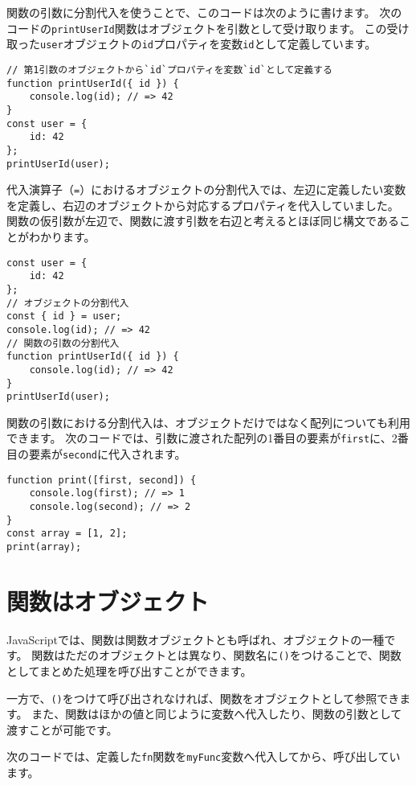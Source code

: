 関数の引数に分割代入を使うことで、このコードは次のように書けます。
次のコードの\texttt{printUserId}関数はオブジェクトを引数として受け取ります。
この受け取った\texttt{user}オブジェクトの\texttt{id}プロパティを変数\texttt{id}として定義しています。

\begin{lstlisting}
// 第1引数のオブジェクトから`id`プロパティを変数`id`として定義する
function printUserId({ id }) {
    console.log(id); // => 42
}
const user = {
    id: 42
};
printUserId(user);
\end{lstlisting}

代入演算子（\texttt{=}）におけるオブジェクトの分割代入では、左辺に定義したい変数を定義し、右辺のオブジェクトから対応するプロパティを代入していました。
関数の仮引数が左辺で、関数に渡す引数を右辺と考えるとほぼ同じ構文であることがわかります。

\begin{lstlisting}
const user = {
    id: 42
};
// オブジェクトの分割代入
const { id } = user;
console.log(id); // => 42
// 関数の引数の分割代入
function printUserId({ id }) {
    console.log(id); // => 42
}
printUserId(user);
\end{lstlisting}

関数の引数における分割代入は、オブジェクトだけではなく配列についても利用できます。
次のコードでは、引数に渡された配列の1番目の要素が\texttt{first}に、2番目の要素が\texttt{second}に代入されます。

\begin{lstlisting}
function print([first, second]) {
    console.log(first); // => 1
    console.log(second); // => 2
}
const array = [1, 2];
print(array);
\end{lstlisting}

\hypertarget{first-class-function}{%
\section{関数はオブジェクト}\label{first-class-function}}

JavaScriptでは、関数は関数オブジェクトとも呼ばれ、オブジェクトの一種です。
関数はただのオブジェクトとは異なり、関数名に\texttt{()}をつけることで、関数としてまとめた処理を呼び出すことができます。

一方で、\texttt{()}をつけて呼び出されなければ、関数をオブジェクトとして参照できます。
また、関数はほかの値と同じように変数へ代入したり、関数の引数として渡すことが可能です。

次のコードでは、定義した\texttt{fn}関数を\texttt{myFunc}変数へ代入してから、呼び出しています。

